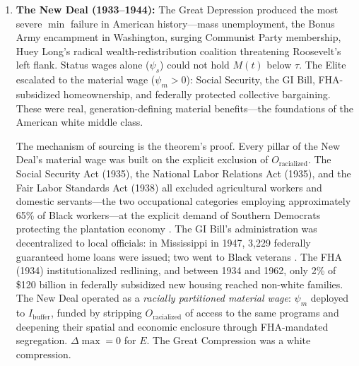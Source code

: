 \begin{enumerate}
    Du Bois's analysis in \textit{Black Reconstruction} \cite{dubois} is definitive: the counter-revolution that ended Reconstruction was driven primarily by a \textit{class alliance}---Northern industrial capital and Southern Redeemer elites recognizing that multiracial democracy threatened extraction at the national scale. The Freedmen's Bureau land redistribution program (40 acres) would have created an independent Black landowning class outside the extractive agricultural system. The Reconstruction labor laws threatened to raise wages for both Black and white workers by creating competitive bidding for labor in the South. The Elite's response was to fund, coordinate, and legitimize the Redeemer campaign---combining paramilitary violence (the Ku Klux Klan, the Red Shirts) with electoral fraud and the withdrawal of federal enforcement. The Compromise of 1877 formalized the deal: Northern capital removed federal troops from the South, handing Reconstruction's multiracial democracy to Redeemer violence, in exchange for the railroad land grants and tariff protections that would fund industrial expansion. $\Delta\max = 0$: the reforms were permitted just long enough to stabilize the post-war $\min$ threshold, then dismantled the moment the kinetic threat subsided.

    \item \textbf{The New Deal (1933--1944):} The Great Depression produced the most severe $\min$ failure in American history---mass unemployment, the Bonus Army encampment in Washington, surging Communist Party membership, Huey Long's radical wealth-redistribution coalition threatening Roosevelt's left flank. Status wages alone ($\psi_s$) could not hold $M(t)$ below $\tau$. The Elite escalated to the material wage ($\psi_m > 0$): Social Security, the GI Bill, FHA-subsidized homeownership, and federally protected collective bargaining. These were real, generation-defining material benefits---the foundations of the American white middle class.

    The mechanism of sourcing is the theorem's proof. Every pillar of the New Deal's material wage was built on the explicit exclusion of $O_{\text{racialized}}$. The Social Security Act (1935), the National Labor Relations Act (1935), and the Fair Labor Standards Act (1938) all excluded agricultural workers and domestic servants---the two occupational categories employing approximately 65\% of Black workers---at the explicit demand of Southern Democrats protecting the plantation economy \cite{katznelson_fear}. The GI Bill's administration was decentralized to local officials: in Mississippi in 1947, 3,229 federally guaranteed home loans were issued; two went to Black veterans \cite{katznelson_fear}. The FHA (1934) institutionalized redlining, and between 1934 and 1962, only 2\% of \$120 billion in federally subsidized new housing reached non-white families. The New Deal operated as a \textit{racially partitioned material wage}: $\psi_m$ deployed to $I_{\text{buffer}}$, funded by stripping $O_{\text{racialized}}$ of access to the same programs and deepening their spatial and economic enclosure through FHA-mandated segregation. $\Delta\max = 0$ for $E$. The Great Compression was a white compression.


\end{enumerate}
